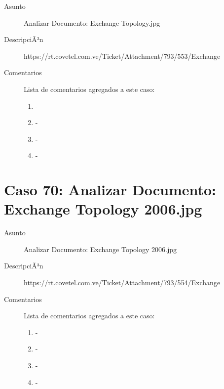 \begin{description}

\item[Asunto] Analizar Documento: Exchange Topology.jpg \item[DescripciÃ³n] https://rt.covetel.com.ve/Ticket/Attachment/793/553/Exchange%

\item[Comentarios] Lista de comentarios agregados a este caso:  
\begin{enumerate}
        \item {\bfseries  } - {\bfseries } \\         \item {\bfseries  } - {\bfseries } \\         \item {\bfseries  } - {\bfseries } \\         \item {\bfseries  } - {\bfseries } \\     \end{enumerate}

\end{description}

\section{Caso 70: Analizar Documento: Exchange Topology 2006.jpg }

\begin{description}

\item[Asunto] Analizar Documento: Exchange Topology 2006.jpg\item[DescripciÃ³n] https://rt.covetel.com.ve/Ticket/Attachment/793/554/Exchange%

\item[Comentarios] Lista de comentarios agregados a este caso:  
\begin{enumerate}
        \item {\bfseries  } - {\bfseries } \\         \item {\bfseries  } - {\bfseries } \\         \item {\bfseries  } - {\bfseries } \\         \item {\bfseries  } - {\bfseries } \\     \end{enumerate}

\end{description}


